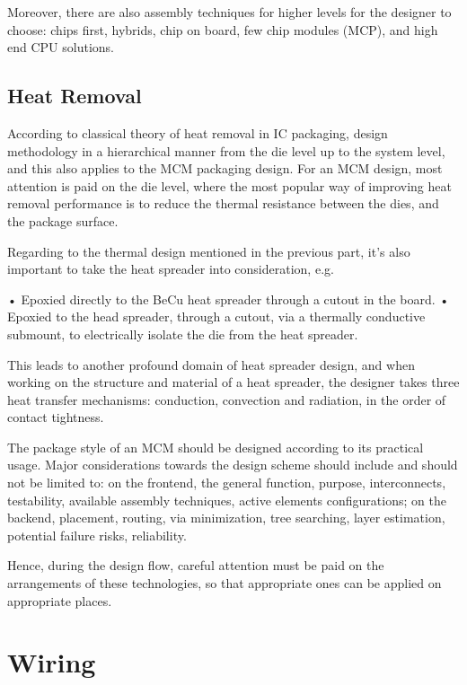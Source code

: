 \begin{spacing}{1.5}
Moreover, there are also assembly techniques for higher levels for the designer to choose: chips first, hybrids, chip on board, few chip modules (MCP), and high end CPU solutions. \cite{bogatin1997roadmaps}


\subsection{Heat Removal}

According to classical theory of heat removal in IC packaging, design methodology in a hierarchical manner from the die level up to the system level, and this also applies to the MCM packaging design. For an MCM design, most attention is paid on the die level, where the most popular way of improving heat removal performance is to reduce the thermal resistance between the dies, and the package surface. 

Regarding to the thermal design mentioned in the previous part, it's also important to take the heat spreader into consideration, e.g.

• Epoxied directly to the BeCu heat spreader through a cutout in the board. 
• Epoxied to the head spreader, through a cutout, via a thermally conductive submount, to electrically isolate the die from the heat spreader. 

This leads to another profound domain of heat spreader design, and when working on the structure and material of a heat spreader, the designer takes three heat transfer mechanisms: conduction, convection and radiation, in the order of contact tightness. 

The package style of an MCM should be designed according to its practical usage. Major considerations towards the design scheme should include and should not be limited to: on the frontend, the general function, purpose, interconnects, testability, available assembly techniques, active elements configurations; on the backend, placement, routing, via minimization, tree searching, layer estimation, potential failure risks, reliability. 

Hence, during the design flow, careful attention must be paid on the arrangements of these technologies, so that appropriate ones can be applied on appropriate places. \cite{chen2006vlsi} 

\section{Wiring}


\end{spacing}
